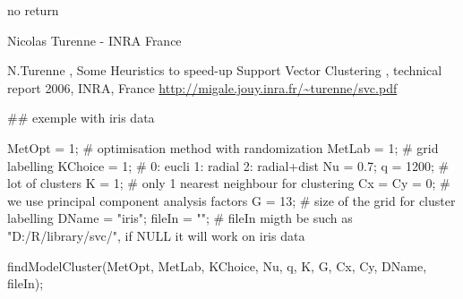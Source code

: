\begin{Value}
no return
\end{Value}
\begin{Author}\relax
Nicolas Turenne - INRA France 
\end{Author}
\begin{References}\relax
N.Turenne , Some Heuristics to speed-up Support Vector Clustering , technical report 2006, INRA, France 
\url{http://migale.jouy.inra.fr/~turenne/svc.pdf}
\end{References}
\begin{Examples}
\begin{ExampleCode}

## exemple with iris data

MetOpt  = 1;    # optimisation method with randomization
MetLab  = 1;    # grid labelling
KChoice = 1;    # 0: eucli 1: radial 2: radial+dist 
Nu      = 0.7; 
q       = 1200;   # lot of clusters
K       = 1;    # only 1  nearest neighbour for clustering
Cx = Cy = 0; # we use principal component analysis factors
G       = 13; # size of the grid for cluster labelling
DName   = "iris";
fileIn  = ""; # fileIn migth be such as "D:/R/library/svc/", if NULL it will work on iris data

findModelCluster(MetOpt, MetLab, KChoice, Nu, q, K, G, Cx, Cy, DName, fileIn); 

\end{ExampleCode}
\end{Examples}

